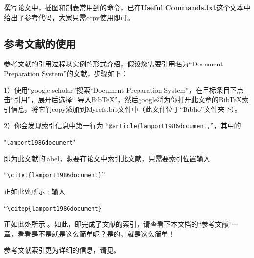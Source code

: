 撰写论文中，插图和制表常用到的命令，已在\textbf{Useful Commands.txt}这个文本中给出了参考代码，大家只需copy使用即可。

\subsection{参考文献的使用}

参考文献的引用过程以实例的形式介绍，假设您需要引用名为“Document Preparation System”的文献，步骤如下：

1）使用“google scholar”搜索“Document Preparation System”，在目标条目下点击“引用”，展开后选择“ 导入BibTeX”，然后google将为你打开此文章的BibTeX索引信息，将它们copy添加到Myrefs.bib文件中（此文件位于“Biblio”文件夹下）。

2）你会发现索引信息中第一行为 “\verb|@article{lamport1986document,|”，其中的 
    
    "\verb|lamport1986document|" 
    
即为此文献的label，想要在论文中索引此文献，只需要索引位置输入 

“\verb|\citet{lamport1986document}|”

正如此处所示 \citet{lamport1986document}; 输入

“\verb|\citep{lamport1986document}|

正如此处所示 \citep{lamport1986document}。如此，即完成了文献的索引，请查看下本文档的“参考文献”一章，看看是不是就是这么简单呢？是的，就是这么简单！

参考文献索引更为详细的信息，请见\citep{website:wikipedia}。
